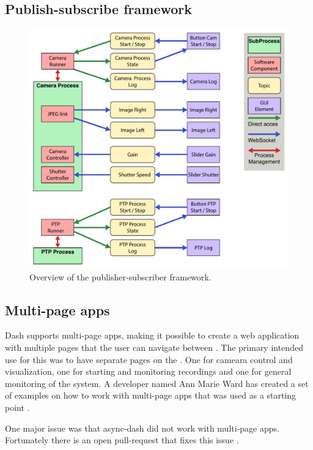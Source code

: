 \subsection{Publish-subscribe framework}
\begin{figure}[H]
    \centering
    \includegraphics[width=\textwidth]{figures/gui/pubsub_graph.pdf}
    \caption{Overview of the publisher-subscriber framework.}
    \label{fig:pub_sub_graph}
\end{figure}

\subsection{Multi-page apps}
Dash supports multi-page apps, making it possible to create a web application with multiple pages that the user can navigate between \cite{plotlyMultiPageAppsURL}.
The primary intended use for this was to have separate pages on the \srgui.
One for cameara control and visualization, one for starting and monitoring recordings and one for general monitoring of the system.
A developer named Ann Marie Ward has created a set of examples on how to work with multi-page apps that was used as a starting point \cite{wardExamplesMultipageApps03Jul22}.

One major issue was that \gls{async-dash} did not work with multi-page apps.
Fortunately there is an open pull-request that fixes this issue \cite{lekAddFlaskRequest2022}.